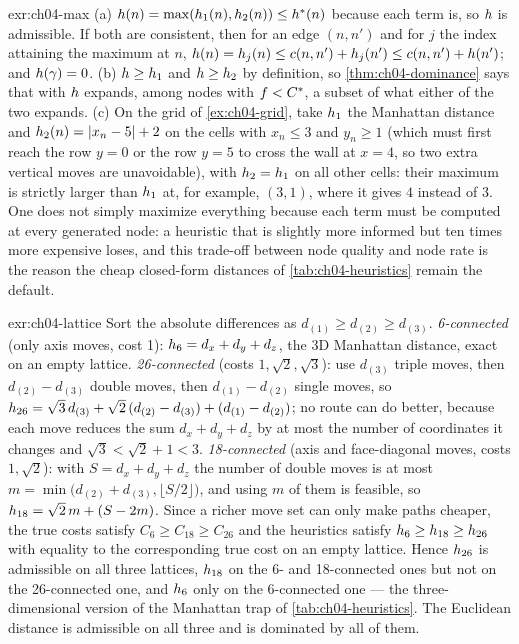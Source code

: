 \begin{solution}{exr:ch04-max}
(a) $h(n)=\max(h_1(n),h_2(n))\le h^*(n)$ because each term is, so $h$ is admissible. If both are consistent, then for an edge $(n,n')$ and for $j$ the index attaining the maximum at $n$, $h(n)=h_j(n)\le c(n,n')+h_j(n')\le c(n,n')+h(n')$; and $h(\gamma)=0$. (b) $h\ge h_1$ and $h\ge h_2$ by definition, so \cref{thm:ch04-dominance} says that \astar with $h$ expands, among nodes with $f<C^*$, a subset of what either of the two expands. (c) On the grid of \cref{ex:ch04-grid}, take $h_1$ the Manhattan distance and $h_2(n)=\left\lvert x_n-5 \right\rvert+2$ on the cells with $x_n\le3$ and $y_n\ge1$ (which must first reach the row $y=0$ or the row $y=5$ to cross the wall at $x=4$, so two extra vertical moves are unavoidable), with $h_2=h_1$ on all other cells: their maximum is strictly larger than $h_1$ at, for example, $(3,1)$, where it gives $4$ instead of $3$. One does not simply maximize everything because each term must be computed at every generated node: a heuristic that is slightly more informed but ten times more expensive loses, and this trade-off between node quality and node rate is the reason the cheap closed-form distances of \cref{tab:ch04-heuristics} remain the default.
\end{solution}

\begin{solution}{exr:ch04-lattice}
Sort the absolute differences as $d_{(1)}\ge d_{(2)}\ge d_{(3)}$. \emph{6-connected} (only axis moves, cost 1): $h_6=d_x+d_y+d_z$, the 3D Manhattan distance, exact on an empty lattice. \emph{26-connected} (costs $1,\sqrt2,\sqrt3$): use $d_{(3)}$ triple moves, then $d_{(2)}-d_{(3)}$ double moves, then $d_{(1)}-d_{(2)}$ single moves, so $h_{26}=\sqrt3\,d_{(3)}+\sqrt2\,(d_{(2)}-d_{(3)})+(d_{(1)}-d_{(2)})$; no route can do better, because each move reduces the sum $d_x+d_y+d_z$ by at most the number of coordinates it changes and $\sqrt3<\sqrt2+1<3$. \emph{18-connected} (axis and face-diagonal moves, costs $1,\sqrt2$): with $S=d_x+d_y+d_z$ the number of double moves is at most $m=\min\bigl(d_{(2)}+d_{(3)},\lfloor S/2\rfloor\bigr)$, and using $m$ of them is feasible, so $h_{18}=\sqrt2\,m+(S-2m)$. Since a richer move set can only make paths cheaper, the true costs satisfy $C_6\ge C_{18}\ge C_{26}$ and the heuristics satisfy $h_6\ge h_{18}\ge h_{26}$ with equality to the corresponding true cost on an empty lattice. Hence $h_{26}$ is admissible on all three lattices, $h_{18}$ on the 6- and 18-connected ones but not on the 26-connected one, and $h_6$ only on the 6-connected one --- the three-dimensional version of the Manhattan trap of \cref{tab:ch04-heuristics}. The Euclidean distance is admissible on all three and is dominated by all of them.
\end{solution}


